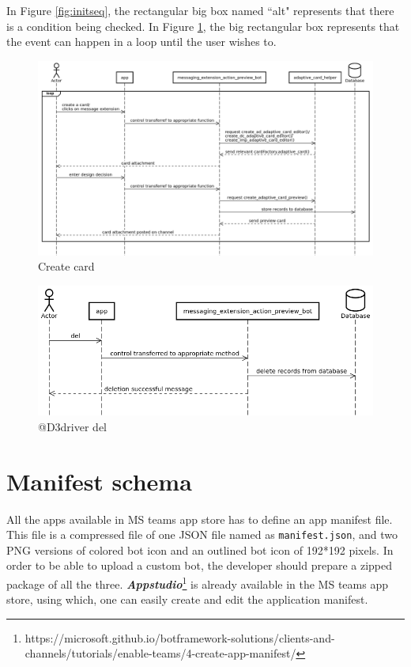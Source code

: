 In Figure \ref{fig:initseq}, the rectangular big box named ``alt" represents that there is a condition being checked. In Figure \ref{fig:create cardseq}, the big rectangular box represents that the event can happen in a loop until the user wishes to.


\begin{figure}[h]
\centering
\includegraphics[width=1.1\linewidth]{"figures/create cardseq"}
\captionsetup{justification=centering}
\caption{Create card}
\label{fig:create cardseq}
\end{figure}

\begin{figure}[h]
\centering
\includegraphics[width=0.9\linewidth]{figures/delseq}
\captionsetup{justification=centering}
\caption{@D3driver del}
\label{fig:delseq}
\end{figure}



\section{Manifest schema}
All the apps available in MS teams app store has to define an app manifest file. This file is a compressed file of one JSON file named as \texttt{manifest.json}, and two PNG versions of colored bot icon and an outlined bot icon of 192*192 pixels. In order to be able to upload a custom bot, the developer should prepare a zipped package of all the three. \textbf{\textit{Appstudio}}\footnote{https://microsoft.github.io/botframework-solutions/clients-and-channels/tutorials/enable-teams/4-create-app-manifest/} is already available in the MS teams app store, using which, one can easily create and edit the application manifest.

